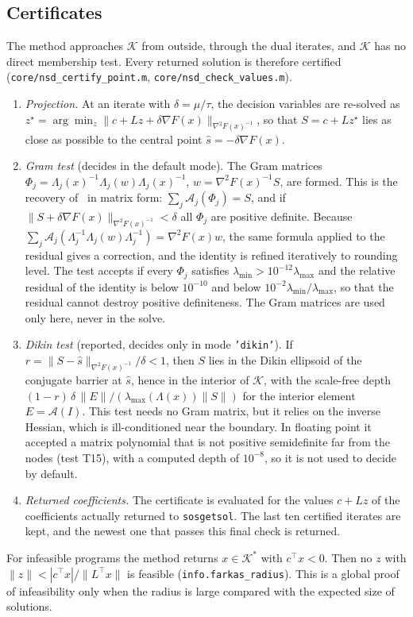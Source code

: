 \documentclass[11pt,a4paper]{article}
\newcommand{\cA}{\mathcal{A}}
\newcommand{\cK}{\mathcal{K}}
\newcommand{\code}[1]{\texttt{#1}}
\begin{document}
\subsection{Certificates}\label{sec:cert}
The method approaches $\cK$ from outside, through the dual iterates, and $\cK$ has no direct membership test. Every returned solution is therefore certified (\code{core/nsd\_certify\_point.m}, \code{core/nsd\_check\_values.m}).
\begin{enumerate}[itemsep=2pt]
\item \emph{Projection.} At an iterate with $\delta=\mu/\tau$, the decision variables are re-solved as $z^\star=\arg\min_z\|c+Lz+\delta\nabla F(x)\|_{\nabla^2F(x)^{-1}}$, so that $S=c+Lz^\star$ lies as close as possible to the central point $\hat s=-\delta\nabla F(x)$.
\item \emph{Gram test} (decides in the default mode). The Gram matrices $\Phi_j=\Lambda_j(x)^{-1}\Lambda_j(w)\Lambda_j(x)^{-1}$, $w=\nabla^2F(x)^{-1}S$, are formed. This is the recovery of~\cite[Thm.~5.1]{PappYildiz2019} in matrix form: $\sum_j\cA_j(\Phi_j)=S$, and if $\|S+\delta\nabla F(x)\|_{\nabla^2F(x)^{-1}}<\delta$ all $\Phi_j$ are positive definite. Because $\sum_j\cA_j(\Lambda_j^{-1}\Lambda_j(w)\Lambda_j^{-1})=\nabla^2F(x)w$, the same formula applied to the residual gives a correction, and the identity is refined iteratively to rounding level. The test accepts if every $\Phi_j$ satisfies $\lambda_{\min}>10^{-12}\lambda_{\max}$ and the relative residual of the identity is below $10^{-10}$ and below $10^{-2}\lambda_{\min}/\lambda_{\max}$, so that the residual cannot destroy positive definiteness. The Gram matrices are used only here, never in the solve.
\item \emph{Dikin test} (reported, decides only in mode \code{'dikin'}). If $r=\|S-\hat s\|_{\nabla^2F(x)^{-1}}/\delta<1$, then $S$ lies in the Dikin ellipsoid of the conjugate barrier at $\hat s$, hence in the interior of $\cK$, with the scale-free depth $(1-r)\,\delta\,\|E\|/(\lambda_{\max}(\Lambda(x))\|S\|)$ for the interior element $E=\cA(I)$. This test needs no Gram matrix, but it relies on the inverse Hessian, which is ill-conditioned near the boundary. In floating point it accepted a matrix polynomial that is not positive semidefinite far from the nodes (test T15), with a computed depth of $10^{-8}$, so it is not used to decide by default.
\item \emph{Returned coefficients.} The certificate is evaluated for the values $c+Lz$ of the coefficients actually returned to \code{sosgetsol}. The last ten certified iterates are kept, and the newest one that passes this final check is returned.
\end{enumerate}
For infeasible programs the method returns $x\in\cK^\ast$ with $c^\top x<0$. Then no $z$ with $\|z\|<|c^\top x|/\|L^\top x\|$ is feasible (\code{info.farkas\_radius}). This is a global proof of infeasibility only when the radius is large compared with the expected size of solutions.
\end{document}
